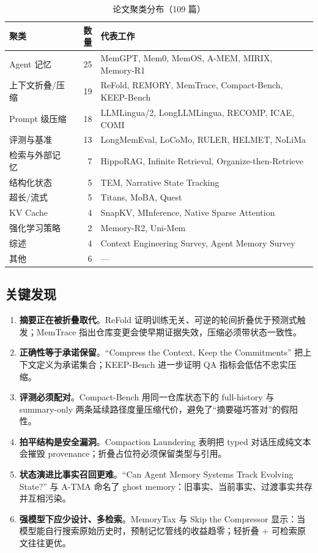 \documentclass[11pt,a4paper]{ctexart}
\begin{document}
\begin{table}[htbp]
\centering
\caption{论文聚类分布（109 篇）}
\begin{tabular}{lrl}
\toprule
聚类 & 数量 & 代表工作 \\
\midrule
Agent 记忆 & 25 & MemGPT, Mem0, MemOS, A-MEM, MIRIX, Memory-R1 \\
上下文折叠/压缩 & 19 & ReFold, REMORY, MemTrace, Compact-Bench, KEEP-Bench \\
Prompt 级压缩 & 18 & LLMLingua/2, LongLLMLingua, RECOMP, ICAE, COMI \\
评测与基准 & 13 & LongMemEval, LoCoMo, RULER, HELMET, NoLiMa \\
检索与外部记忆 & 7 & HippoRAG, Infinite Retrieval, Organize-then-Retrieve \\
结构化状态 & 5 & TEM, Narrative State Tracking \\
超长/流式 & 5 & Titans, MoBA, Quest \\
KV Cache & 4 & SnapKV, MInference, Native Sparse Attention \\
强化学习策略 & 2 & Memory-R2, Uni-Mem \\
综述 & 4 & Context Engineering Survey, Agent Memory Survey \\
其他 & 6 & --- \\
\bottomrule
\end{tabular}
\end{table}

\subsection{关键发现}
\begin{enumerate}
  \item \textbf{摘要正在被折叠取代}。ReFold \cite{refold} 证明训练无关、可逆的轮间折叠优于预测式触发；MemTrace \cite{memtrace} 指出仓库变更会使早期证据失效，压缩必须带状态一致性。
  \item \textbf{正确性等于承诺保留}。“Compress the Context, Keep the Commitments” \cite{commitments} 把上下文定义为承诺集合；KEEP-Bench \cite{keepbench} 进一步证明 QA 指标会低估不忠实压缩。
  \item \textbf{评测必须配对}。Compact-Bench \cite{compactbench} 用同一仓库状态下的 full-history 与 summary-only 两条延续路径度量压缩代价，避免了“摘要碰巧答对”的假阳性。
  \item \textbf{拍平结构是安全漏洞}。Compaction Laundering \cite{laundering} 表明把 typed 对话压成纯文本会摧毁 provenance；折叠占位符必须保留类型与引用。
  \item \textbf{状态演进比事实召回更难}。“Can Agent Memory Systems Track Evolving State?” \cite{evolving} 与 A-TMA \cite{atma} 命名了 ghost memory：旧事实、当前事实、过渡事实共存并互相污染。
  \item \textbf{强模型下应少设计、多检索}。MemoryTax \cite{memorytax} 与 Skip the Compressor \cite{skipcompressor} 显示：当模型能自行搜索原始历史时，预制记忆管线的收益趋零；轻折叠 + 可检索原文往往更优。
\end{enumerate}
\end{document}
